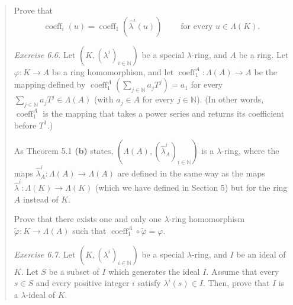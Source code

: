 \documentclass[numbers=enddot,12pt,final,onecolumn,notitlepage]{scrartcl}%
\begin{document}
\begin{quotation}
Prove that%
\[
\operatorname*{coeff}\nolimits_{i}\left(  u\right)  =\operatorname*{coeff}%
\nolimits_{1}\left(  \widehat{\lambda}^{i}\left(  u\right)  \right)
\ \ \ \ \ \ \ \ \ \ \text{for every }u\in\Lambda\left(  K\right)  .
\]


\textit{Exercise 6.6.} Let $\left(  K,\left(  \lambda^{i}\right)
_{i\in\mathbb{N}}\right)  $ be a special $\lambda$-ring, and $A$ be a ring.
Let $\varphi:K\rightarrow A$ be a ring homomorphism, and let
$\operatorname*{coeff}\nolimits_{1}^{A}:\Lambda\left(  A\right)  \rightarrow
A$ be the mapping defined by $\operatorname*{coeff}\nolimits_{1}^{A}\left(
\sum\limits_{j\in\mathbb{N}}a_{j}T^{j}\right)  =a_{1}$ for every
$\sum\limits_{j\in\mathbb{N}}a_{j}T^{j}\in\Lambda\left(  A\right)  $ (with
$a_{j}\in A$ for every $j\in\mathbb{N}$). (In other words,
$\operatorname*{coeff}\nolimits_{1}^{A}$ is the mapping that takes a power
series and returns its coefficient before $T^{1}.$)

As Theorem 5.1 \textbf{(b)} states, $\left(  \Lambda\left(  A\right)  ,\left(
\widehat{\lambda}_{A}^{i}\right)  _{i\in\mathbb{N}}\right)  $ is a $\lambda
$-ring, where the maps $\widehat{\lambda}_{A}^{i}:\Lambda\left(  A\right)
\rightarrow\Lambda\left(  A\right)  $ are defined in the same way as the maps
$\widehat{\lambda}^{i}:\Lambda\left(  K\right)  \rightarrow\Lambda\left(
K\right)  $ (which we have defined in Section 5) but for the ring $A$ instead
of $K$.

Prove that there exists one and only one $\lambda$-ring homomorphism
$\widetilde{\varphi}:K\rightarrow\Lambda\left(  A\right)  $ such that
$\operatorname*{coeff}\nolimits_{1}^{A}\circ\widetilde{\varphi}=\varphi$.

\textit{Exercise 6.7.} Let $\left(  K,\left(  \lambda^{i}\right)
_{i\in\mathbb{N}}\right)  $ be a special $\lambda$-ring, and $I$ be an ideal
of $K$. Let $S$ be a subset of $I$ which generates the ideal $I$. Assume that
every $s\in S$ and every positive integer $i$ satisfy $\lambda^{i}\left(
s\right)  \in I$. Then, prove that $I$ is a $\lambda$-ideal of $K$.


\end{quotation}
\end{document}

